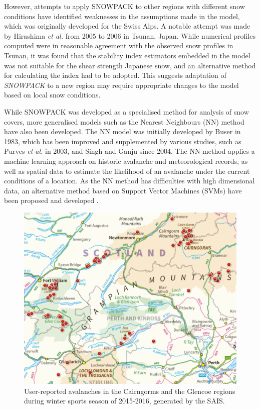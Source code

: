 \documentclass[openany]{UoYCSproject}
\begin{document}
However, attempts to apply SNOWPACK to other regions with different snow conditions have identified weaknesses in the assumptions made in the model, which was originally developed for the Swiss Alps. A notable attempt was made by Hirashima \textit{et al.} \cite{Hirashima2008191} from 2005 to 2006 in Tsunan, Japan. While numerical profiles computed were in reasonable agreement with the observed snow profiles in Tsunan, it was found that the stability index estimators embedded in the model was not suitable for the shear strength Japanese snow, and an alternative method for calculating the index had to be adopted. This suggests adaptation of \textit{SNOWPACK} to a new region may require appropriate changes to the model based on local snow conditions.

While SNOWPACK was developed as a specialised method for analysis of snow covers, more generalised models such as the Nearest Neighbours (NN) method have also been developed. The NN model was initially developed by Buser \cite{buser1983avalanche} in 1983, which has been improved and supplemented by various studies, such as Purves \textit{et al.} in 2003, and Singh and Ganju \cite{Singh2004105} \cite{Singh201533} since 2004. The NN method applies a machine learning approach on historic avalanche and meteorological records, as well as spatial data to estimate the likelihood of an avalanche under the current conditions of a location. As the NN method has difficulties with high dimensional data, an alternative method based on Support Vector Machines (SVMs) have been proposed and developed \cite{Lehning2001253} \cite{pozdnoukhov2011spatio}.

\begin{figure}[h]
		\centering
		\includegraphics[scale=0.4]{ScotAvalanches1516.png}
		\caption{\label{fig:scotava1516} User-reported avalanches in the Cairngorms and the Glencoe regions during winter sports season of 2015-2016, generated by the SAIS.\cite{sais-map}}
\end{figure}
\end{document}
